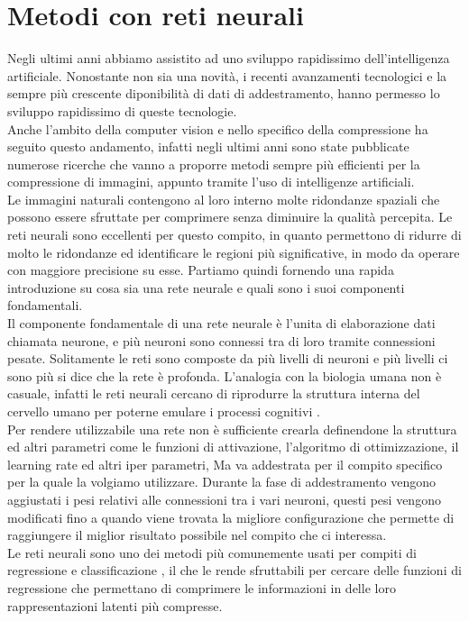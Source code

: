 \chapter{Metodi con reti neurali}
Negli ultimi anni abbiamo assistito ad uno sviluppo rapidissimo dell’intelligenza artificiale. Nonostante non sia una novità, i recenti avanzamenti tecnologici e la sempre più crescente diponibilità di dati di addestramento, hanno permesso lo sviluppo rapidissimo di queste tecnologie.\\
Anche l’ambito della computer vision e nello specifico della compressione ha seguito questo andamento, infatti negli ultimi anni sono state pubblicate numerose ricerche che vanno a proporre metodi sempre più efficienti per la compressione di immagini, appunto tramite l’uso di intelligenze artificiali.\\
Le immagini naturali contengono al loro interno molte ridondanze spaziali che possono essere sfruttate per comprimere senza diminuire la qualità percepita. Le reti neurali sono eccellenti per questo compito, in quanto permettono di ridurre di molto le ridondanze ed identificare le regioni più significative, in modo da operare con maggiore precisione su esse.
Partiamo quindi fornendo una rapida introduzione su cosa sia una rete neurale e quali sono i suoi componenti fondamentali.\\
Il componente fondamentale di una rete neurale è l’unita di elaborazione dati chiamata neurone, e più neuroni sono connessi tra di loro tramite connessioni pesate. Solitamente le reti sono composte da più livelli di neuroni e più livelli ci sono più si dice che la rete è profonda. L’analogia con la biologia umana non è casuale, infatti le reti neurali cercano di riprodurre la struttura interna del cervello umano per poterne emulare i processi cognitivi \cite{sadeeq2021image}.\\
Per rendere utilizzabile una rete non è sufficiente crearla definendone la struttura ed altri parametri come le funzioni di attivazione, l’algoritmo di ottimizzazione, il learning rate ed altri iper parametri, Ma va addestrata per il compito specifico per la quale la volgiamo utilizzare. Durante la fase di addestramento vengono aggiustati i pesi relativi alle connessioni tra i vari neuroni, questi pesi vengono modificati fino a quando viene trovata la migliore configurazione che permette di raggiungere il miglior risultato possibile nel compito che ci interessa.\\
Le reti neurali sono uno dei metodi più comunemente usati per compiti di regressione e classificazione \cite{sadeeq2021image}, il che le rende sfruttabili per cercare delle funzioni di regressione che permettano di comprimere le informazioni in delle loro rappresentazioni latenti più compresse.
